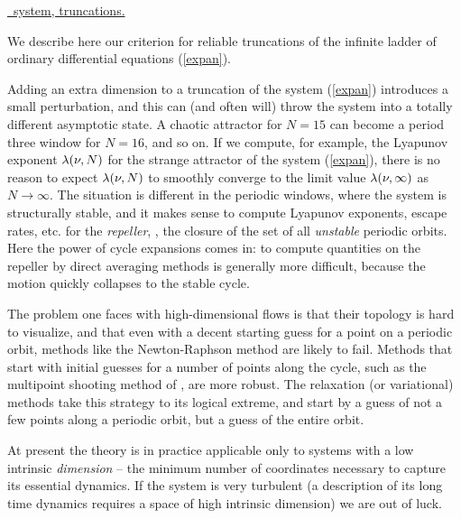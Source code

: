 \underline{\KS\ system, truncations.}{
We describe here our criterion for reliable
truncations of the infinite ladder of 
ordinary differential equations (\ref{expan}).

Adding an extra dimension to a truncation of the system (\ref{expan})
introduces a small
perturbation, and this can (and often will) 
throw the system into a totally different asymptotic state. 
A  chaotic attractor for $N=15$ can become a period three 
window for $N=16$, and so on. 
If we compute, for example, the Lyapunov exponent
$\lambda(\nu,N)$ for the strange attractor of the 
system (\ref{expan}), there is no reason to 
expect $\lambda(\nu,N)$ to smoothly converge to the limit  
value $\lambda(\nu,\infty)$ as $N \rightarrow \infty$. 
The situation is different in the periodic windows, 
where the system is structurally stable, and it makes sense to compute 
 Lyapunov exponents, escape rates, etc. for the 
{\em repeller}, \ie, the closure of the set of all 
{\em unstable} periodic orbits. 
Here the power of cycle expansions comes in: 
to compute quantities on the repeller by direct averaging methods is 
generally more difficult, because the motion quickly collapses to the 
stable cycle. 
	} %


The problem one faces with high-dimensional flows is 
that their topology is hard to
visualize, and that even with a decent starting guess for a point on
a periodic orbit, methods like the Newton-Raphson method are likely to fail.
Methods that start with initial guesses for a number of points along the
cycle, such as the multipoint shooting method of ,
are more robust.
The relaxation  (or variational) methods take this strategy to its
logical extreme,
and start by a guess of not a few points along a periodic orbit,
but a guess of the entire orbit.

At present the theory is in practice applicable only to systems
with a low intrinsic {\em dimension}
-- the minimum number of coordinates necessary to
capture its essential dynamics.
If the system is very turbulent
(a description of its long time dynamics requires a space of high
intrinsic dimension) we are out of luck. 

% 


